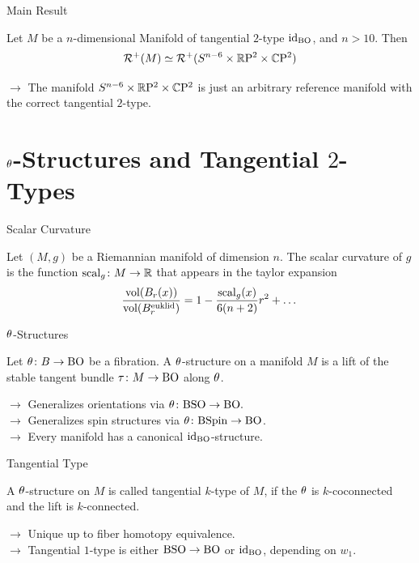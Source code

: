 \documentclass{presis}
\begin{document}
\begin{frame}{Main Result}
    \begin{thm}
    Let $M$ be a $n$-dimensional Manifold of tangential $2$-type $\operatorname{id}_{\mathrm{BO}}$, and $n>10$. Then
    \begin{equation*}
        \mathcal{R}^+(M) \simeq \mathcal{R}^+(S^{n-6}\times\mathbb{R}\mathrm{P}^2\times\mathbb{C}\mathrm{P}^2)
    \end{equation*}
    \end{thm}\pause
    $\rightarrow$ The manifold $S^{n-6}\times\mathbb{R}\mathrm{P}^2\times\mathbb{C}\mathrm{P}^2$ is just an arbitrary reference manifold with the correct tangential $2$-type.
\end{frame}

\appendix %
\section*{$\theta$-Structures and Tangential $2$-Types}

\begin{frame}{Scalar Curvature}
    \begin{defi}
Let $(M,g)$ be a Riemannian manifold of dimension $n$.
The scalar curvature of $g$ is the function $\mathrm{scal}_g\colon M\to \mathbb{R}$ that appears in the taylor expansion
\begin{equation*}
    \frac{\mathrm{vol}(B_r(x))}{\mathrm{vol}(B_r^{\text{euklid}})} = 1 - \frac{\mathrm{scal}_g(x)}{6(n+2)}r^2 + \dots
\end{equation*}
\end{defi}
\end{frame}

\begin{frame}{$\theta$-Structures}
    \begin{defi}
        Let $\theta\colon B\to \mathrm{BO}$ be a fibration. 
        A $\theta$-structure on a manifold $M$ is a lift of the stable tangent bundle $\tau\colon M \to \mathrm{BO}$ along $\theta$.
    \end{defi}\pause
    $\rightarrow$ Generalizes orientations via $\theta\colon \mathrm{BSO} \to \mathrm{BO}.$\\\vspace{.3\baselineskip} \pause
    $\rightarrow$ Generalizes spin structures via $\theta\colon\mathrm{BSpin} \to \mathrm{BO}$.\\\vspace{.3\baselineskip}\pause
    $\rightarrow$ Every manifold has a canonical $\operatorname{id}_{\mathrm{BO}}$-structure.
\end{frame}

\begin{frame}{Tangential Type}
    \begin{defi}
        A $\theta$-structure on $M$ is called tangential $k$-type of $M$, if the $\theta$ is $k$-coconnected and the lift is $k$-connected.
    \end{defi}\pause
    $\rightarrow$ Unique up to fiber homotopy equivalence.\\\vspace{.3\baselineskip}\pause
    $\rightarrow$ Tangential $1$-type is either $\mathrm{BSO}\to\mathrm{BO}$ or $\operatorname{id}_{\mathrm{BO}}$, depending on $w_1$.
\end{frame}
\end{document}
